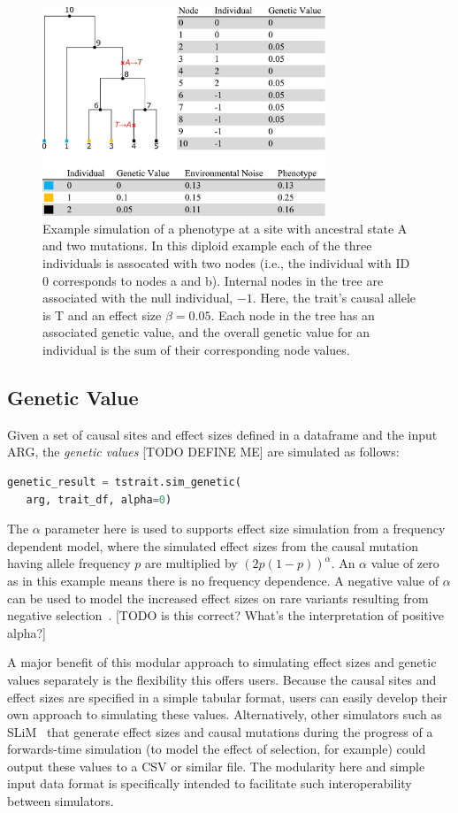 \documentclass[unnumsec,webpdf,modern,large,namedate]{oup-authoring-template}%
\begin{document}
\begin{figure}[t]%
\centering
\includegraphics[width=240pt]{figures/tree-illustration.pdf}
\caption{Example simulation of a phenotype at a site with ancestral state A and
two mutations. In this diploid example each of the three individuals
is assocated with two nodes (i.e., the individual with ID 0 corresponds
to nodes \textsf{a} and \textsf{b}). Internal nodes in the tree are associated
with the null individual, $-1$. Here, the trait's causal allele is T
and an effect size $\beta=0.05$. Each node in the tree has an associated
genetic value, and the overall genetic value for an individual is the
sum of their corresponding node values.
\label{fig:tree-illustration}}
\end{figure}

\subsection{Genetic Value}
Given a set of causal sites and effect sizes defined in a dataframe
and the input ARG, the \emph{genetic values} [TODO DEFINE ME]
are simulated as follows:
\begin{lstlisting}[language=Python]
genetic_result = tstrait.sim_genetic(
   arg, trait_df, alpha=0)
\end{lstlisting}
The $\alpha$ parameter here is used to
supports effect size simulation from a frequency
dependent model, where the simulated effect sizes from the causal mutation
having allele frequency $p$ are multiplied by $\left(2p(1-p)\right)^\alpha$.
An $\alpha$ value of zero as in this example means there is
no frequency dependence. A negative value of $\alpha$
can be used to model the increased effect sizes on rare variants
resulting from negative selection~\citep{speed2017}.
[TODO is this correct? What's the interpretation of positive alpha?]

A major benefit of this modular approach to simulating effect sizes
and genetic values separately is the flexibility this offers
users. Because the causal sites and effect sizes are specified in a
simple tabular format, users can easily develop their own approach
to simulating these values. Alternatively, other simulators
such as SLiM~\citep{haller2023} that generate effect sizes and
causal mutations during the progress of a forwards-time simulation
(to model the effect of selection, for example) could output these
values to a CSV or similar file. The modularity here and simple
input data format is specifically intended to facilitate such
interoperability between simulators.
\end{document}
